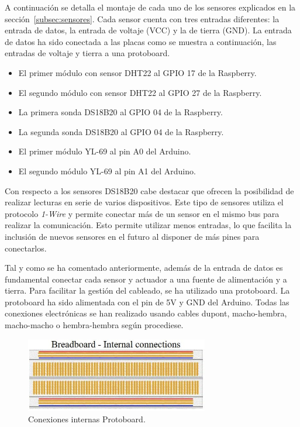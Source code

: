 \documentclass[a4paper, 12pt, oneside]{book}
\begin{document}
A continuación se detalla el montaje de cada uno de los sensores explicados en la sección~\ref{subsec:sensores}. Cada sensor cuenta con tres entradas diferentes: la entrada de datos, la entrada de voltaje (VCC) y la de tierra (GND). La entrada de datos ha sido conectada a las placas como se muestra a continuación, las entradas de voltaje y tierra a una protoboard. 

\begin{itemize}
	\item El primer módulo con sensor DHT22 al GPIO 17 de la Raspberry.
	\item El segundo módulo con sensor DHT22 al GPIO 27 de la Raspberry.
		\item La primera sonda DS18B20 al GPIO 04 de la Raspberry.
	\item La segunda sonda DS18B20 al GPIO 04 de la Raspberry.
	\item El primer módulo YL-69 al pin A0 del Arduino.
	\item El segundo módulo YL-69 al pin A1 del Arduino.
\end{itemize}

Con respecto a los sensores DS18B20 cabe destacar que ofrecen la posibilidad de realizar lecturas en serie de varios dispositivos. Este tipo de sensores utiliza el protocolo \textit{1-Wire} y permite conectar más de un sensor en el mismo bus para realizar la comunicación. Esto permite utilizar menos entradas, lo que facilita la inclusión de nuevos sensores en el futuro al disponer de más pines para conectarlos.

Tal y como se ha comentado anteriormente, además de la entrada de datos es fundamental conectar cada sensor y actuador a una fuente de alimentación y a tierra. Para facilitar la gestión del cableado, se ha utilizado una protoboard. La protoboard ha sido alimentada con el pin de 5V y GND del Arduino. Todas las conexiones electrónicas se han realizado usando cables dupont, macho-hembra, macho-macho o hembra-hembra según procediese.

\begin{figure}[H]
	\centering
    \includegraphics[width=8cm, keepaspectratio]{img/protoboard-conexiones-internas}
    \caption{Conexiones internas Protoboard.}
    \label{figura:conexiones_protoborad}
\end{figure}
\end{document}
